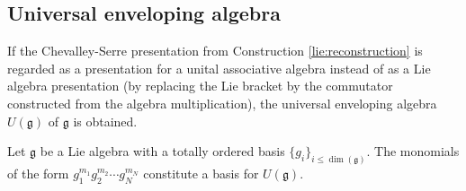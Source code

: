 \subsection{Universal enveloping algebra}\label{section:universal_enveloping_algebra}


    \begin{construct}\label{lie:enveloping_algebra_construct}
        If the Chevalley-Serre presentation from Construction \ref{lie:reconstruction} is regarded as a presentation for a unital associative algebra instead of as a Lie algebra presentation (by replacing the Lie bracket by the commutator constructed from the algebra multiplication), the universal enveloping algebra $U(\mathfrak{g})$ of $\mathfrak{g}$ is obtained.
    \end{construct}

    \begin{theorem}
        Let $\mathfrak{g}$ be a Lie algebra with a totally ordered basis $\{g_i\}_{i\leq\dim(\mathfrak{g})}$. The monomials of the form $g_1^{m_1}g_2^{m_2}\cdots g_N^{m_N}$ constitute a basis for $U(\mathfrak{g})$.
    \end{theorem}

